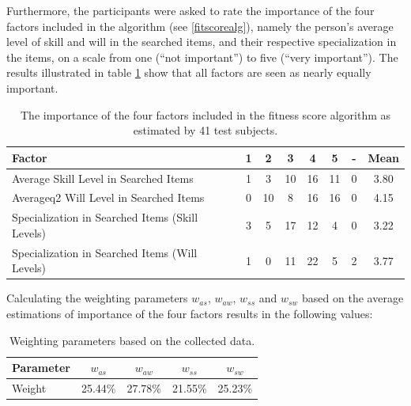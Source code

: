 Furthermore, the participants were asked to rate the importance of the four factors included in the algorithm (see \ref{fitscorealg}), namely the person's average level of skill and will in the searched items, and their respective specialization in the items, on a scale from one (``not important'') to five (``very important''). The results illustrated in table \ref{tab:survey_weight} show that all factors are seen as nearly equally important.
\begin{table}[H]
\centering
\begin{tabular}{l||c|c|c|c|c|c||c}
Factor & 1  & 2  & 3  & 4  & 5  & - & Mean \\
\hline
Average Skill Level in Searched Items & 1 & 3 & 10 & 16 & 11 & 0 & 3.80\\
Averageq2 Will Level in Searched Items & 0 & 10 & 8 & 16 & 16 & 0 & 4.15\\
Specialization in Searched Items (Skill Levels) & 3 & 5 & 17 & 12 & 4 & 0 & 3.22\\
Specialization in Searched Items (Will Levels) & 1 & 0 & 11 & 22 & 5 & 2 & 3.77\\
\end{tabular}
\caption[Survey: Estimated Importance of Weighting Factors]{The importance of the four factors included in the fitness score algorithm as estimated by 41 test subjects.}
\label{tab:survey_weight}
\end{table}


Calculating the weighting parameters $w_{as}$, $w_{aw}$, $w_{ss}$ and $w_{sw}$ based on the average estimations of importance of the four factors results in the following values:
\begin{table}[H]
\centering
\begin{tabular}{l||c|c|c|c}
Parameter & $w_{as}$ & $w_{aw}$ & $w_{ss}$ & $w_{sw}$\\
\hline
Weight & 25.44\% & 27.78\% & 21.55\% & 25.23\% \\
\end{tabular}
\caption[Survey: Resulting Weighting Parameters]{Weighting parameters based on the collected data.}
\end{table}

\newpage

